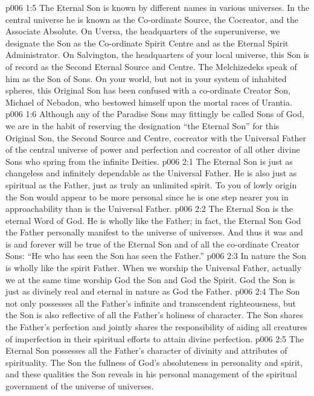 \vs p006 1:5 \pc The Eternal Son is known by different names in various universes. In the central universe he is known as the Co\hyp{}ordinate Source, the Cocreator, and the Associate Absolute. On Uversa, the headquarters of the superuniverse, we designate the Son as the Co\hyp{}ordinate Spirit Centre and as the Eternal Spirit Administrator. On Salvington, the headquarters of your local universe, this Son is of record as the Second Eternal Source and Centre. The Melchizedeks speak of him as the Son of Sons. On your world, but not in your system of inhabited spheres, this Original Son has been confused with a co\hyp{}ordinate Creator Son, Michael of Nebadon, who bestowed himself upon the mortal races of Urantia.
\vs p006 1:6 Although any of the Paradise Sons may fittingly be called Sons of God, we are in the habit of reserving the designation “the Eternal Son” for this Original Son, the Second Source and Centre, cocreator with the Universal Father of the central universe of power and perfection and cocreator of all other divine Sons who spring from the infinite Deities.
\vs p006 2:1 The Eternal Son is just as changeless and infinitely dependable as the Universal Father. He is also just as spiritual as the Father, just as truly an unlimited spirit. To you of lowly origin the Son would appear to be more personal since he is one step nearer you in approachability than is the Universal Father.
\vs p006 2:2 The Eternal Son is the eternal Word of God. He is wholly like the Father; in fact, the Eternal Son  God the Father personally manifest to the universe of universes. And thus it was and is and forever will be true of the Eternal Son and of all the co\hyp{}ordinate Creator Sons: “He who has seen the Son has seen the Father.”
\vs p006 2:3 In nature the Son is wholly like the spirit Father. When we worship the Universal Father, actually we at the same time worship God the Son and God the Spirit. God the Son is just as divinely real and eternal in nature as God the Father.
\vs p006 2:4 The Son not only possesses all the Father’s infinite and transcendent righteousness, but the Son is also reflective of all the Father’s holiness of character. The Son shares the Father’s perfection and jointly shares the responsibility of aiding all creatures of imperfection in their spiritual efforts to attain divine perfection.
\vs p006 2:5 The Eternal Son possesses all the Father’s character of divinity and attributes of spirituality. The Son  the fullness of God’s absoluteness in personality and spirit, and these qualities the Son reveals in his personal management of the spiritual government of the universe of universes.
